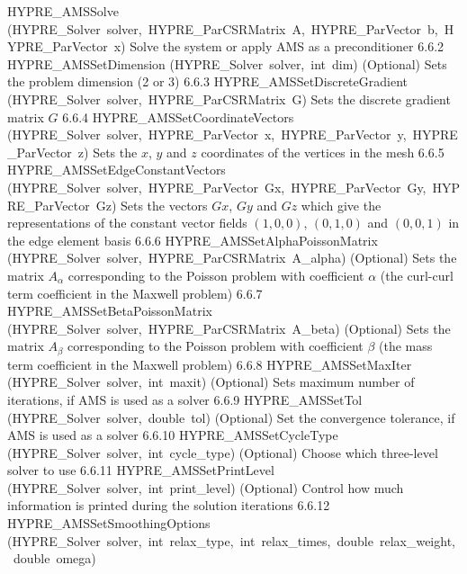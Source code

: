 \documentclass{article}
\begin{document}
\begin{cxxentry}
\begin{cxxentry}
\begin{cxxnames}
        {HYPRE\_AMSSolve}
        {(HYPRE\_Solver\ solver,\ HYPRE\_ParCSRMatrix\ A,\ HYPRE\_ParVector\ b,\ HYPRE\_ParVector\ x)}
        {
Solve the system or apply AMS as a preconditioner}
        {6.6.2}
        {HYPRE\_AMSSetDimension}
        {(HYPRE\_Solver\ solver,\ int\ dim)}
        {
(Optional) Sets the problem dimension (2 or 3)}
        {6.6.3}
        {HYPRE\_AMSSetDiscreteGradient}
        {(HYPRE\_Solver\ solver,\ HYPRE\_ParCSRMatrix\ G)}
        {
Sets the discrete gradient matrix $G$}
        {6.6.4}
        {HYPRE\_AMSSetCoordinateVectors}
        {(HYPRE\_Solver\ solver,\ HYPRE\_ParVector\ x,\ HYPRE\_ParVector\ y,\ HYPRE\_ParVector\ z)}
        {
Sets the $x$, $y$ and $z$ coordinates of the vertices in the mesh}
        {6.6.5}
        {HYPRE\_AMSSetEdgeConstantVectors}
        {(HYPRE\_Solver\ solver,\ HYPRE\_ParVector\ Gx,\ HYPRE\_ParVector\ Gy,\ HYPRE\_ParVector\ Gz)}
        {
Sets the vectors $Gx$, $Gy$ and $Gz$ which give the representations of
the constant vector fields $(1,0,0)$, $(0,1,0)$ and $(0,0,1)$ in the
edge element basis}
        {6.6.6}
        {HYPRE\_AMSSetAlphaPoissonMatrix}
        {(HYPRE\_Solver\ solver,\ HYPRE\_ParCSRMatrix\ A\_alpha)}
        {
(Optional) Sets the matrix $A_\alpha$ corresponding to the Poisson
problem with coefficient $\alpha$ (the curl-curl term coefficient in
the Maxwell problem)}
        {6.6.7}
        {HYPRE\_AMSSetBetaPoissonMatrix}
        {(HYPRE\_Solver\ solver,\ HYPRE\_ParCSRMatrix\ A\_beta)}
        {
(Optional) Sets the matrix $A_\beta$ corresponding to the Poisson
problem with coefficient $\beta$ (the mass term coefficient in the
Maxwell problem)}
        {6.6.8}
        {HYPRE\_AMSSetMaxIter}
        {(HYPRE\_Solver\ solver,\ int\ maxit)}
        {
(Optional) Sets maximum number of iterations, if AMS is used
as a solver}
        {6.6.9}
        {HYPRE\_AMSSetTol}
        {(HYPRE\_Solver\ solver,\ double\ tol)}
        {
(Optional) Set the convergence tolerance, if AMS is used
as a solver}
        {6.6.10}
        {HYPRE\_AMSSetCycleType}
        {(HYPRE\_Solver\ solver,\ int\ cycle\_type)}
        {
(Optional) Choose which three-level solver to use}
        {6.6.11}
        {HYPRE\_AMSSetPrintLevel}
        {(HYPRE\_Solver\ solver,\ int\ print\_level)}
        {
(Optional) Control how much information is printed during the
solution iterations}
        {6.6.12}
        {HYPRE\_AMSSetSmoothingOptions}
        {(HYPRE\_Solver\ solver,\ int\ relax\_type,\ int\ relax\_times,\ double\ relax\_weight,\ double\ omega)}

\end{cxxnames}
\end{cxxentry}
\end{cxxentry}
\end{document}
